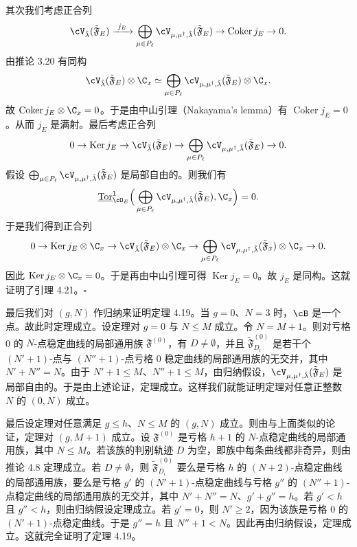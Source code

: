 其次我们考虑正合列
\[
 \cV_{\tilde\lambda}(\tilde{\mathfrak F}_E)\xrightarrow{\ j_E\ }
 \bigoplus_{\mu\in P_\ell}\cV_{\mu,\mu^\dagger,\tilde\lambda}(\tilde{\mathfrak F}_E)
 \to\operatorname{Coker}j_E\to0.
\]
由推论 3.20 有同构
\[
 \cV_{\tilde\lambda}(\tilde{\mathfrak F}_E)\otimes\C_x
 \simeq\bigoplus_{\mu\in P_\ell}\cV_{\mu,\mu^\dagger,\tilde\lambda}(\tilde{\mathfrak F}_E)\otimes\C_x.
\]
故 $\operatorname{Coker}j_E\otimes\C_x=0$。于是由中山引理（Nakayama's lemma）有 $\operatorname{Coker}j_E=0$。从而 $j_E$ 是满射。最后考虑正合列
\[
 0\to\operatorname{Ker}j_E\to\cV_{\tilde\lambda}(\tilde{\mathfrak F}_E)
 \to\bigoplus_{\mu\in P_\ell}\cV_{\mu,\mu^\dagger,\tilde\lambda}(\tilde{\mathfrak F}_E)\to0.
\]
假设 $\bigoplus_{\mu\in P_\ell}\cV_{\mu,\mu^\dagger,\tilde\lambda}(\tilde{\mathfrak F}_E)$ 是局部自由的。则我们有
\[
 \underline{\operatorname{Tor}}^1_{\cO_E}
 \Big(\bigoplus_{\mu\in P_\ell}\cV_{\mu,\mu^\dagger,\tilde\lambda}(\tilde{\mathfrak F}_E),\C_x\Big)=0.
\]
于是我们得到正合列
\[
 0\to\operatorname{Ker}j_E\otimes\C_x\to\cV_{\tilde\lambda}(\tilde{\mathfrak F}_E)\otimes\C_x
 \to\bigoplus_{\mu\in P_\ell}\cV_{\mu,\mu^\dagger,\tilde\lambda}(\tilde{\mathfrak F}_x)\otimes\C_x\to0.
\]
因此 $\operatorname{Ker}j_E\otimes\C_x=0$。于是再由中山引理可得 $\operatorname{Ker}j_E=0$。故 $j_E$ 是同构。这就证明了引理 4.21。\hfill$\square$

最后我们对 $(g,N)$ 作归纳来证明定理 4.19。当 $g=0$、$N=3$ 时，$\cB$ 是一个点。故此时定理成立。设定理对 $g=0$ 与 $N\le M$ 成立。令 $N=M+1$。则对亏格 0 的 $N$-点稳定曲线的局部通用族 $\mathfrak F^{(0)}$，有 $D\ne\emptyset$，并且 $\tilde{\mathfrak F}^{(0)}_{D_i}$ 是若干个 $(N'+1)$-点与 $(N''+1)$-点亏格 0 稳定曲线的局部通用族的无交并，其中 $N'+N''=N$。由于 $N'+1\le M$、$N''+1\le M$，由归纳假设，$\cV_{\mu,\mu^\dagger,\tilde\lambda}(\tilde{\mathfrak F}_E)$ 是局部自由的。于是由上述论证，定理成立。这样我们就能证明定理对任意正整数 $N$ 的 $(0,N)$ 成立。

最后设定理对任意满足 $g\le h$、$N\le M$ 的 $(g,N)$ 成立。则由与上面类似的论证，定理对 $(g,M+1)$ 成立。设 $\mathfrak F^{(0)}$ 是亏格 $h+1$ 的 $N$-点稳定曲线的局部通用族，其中 $N\le M$。若该族的判别轨迹 $D$ 为空，即族中每条曲线都非奇异，则由推论 4.8 定理成立。若 $D\ne\emptyset$，则 $\tilde{\mathfrak F}^{(0)}_{D_i}$ 要么是亏格 $h$ 的 $(N+2)$-点稳定曲线的局部通用族，要么是亏格 $g'$ 的 $(N'+1)$-点稳定曲线与亏格 $g''$ 的 $(N''+1)$-点稳定曲线的局部通用族的无交并，其中 $N'+N''=N$、$g'+g''=h$。若 $g'<h$ 且 $g''<h$，则由归纳假设定理成立。若 $g'=0$，则 $N'\ge2$，因为该族是亏格 0 的 $(N'+1)$-点稳定曲线。于是 $g''=h$ 且 $N''+1<N$。因此再由归纳假设，定理成立。这就完全证明了定理 4.19。

